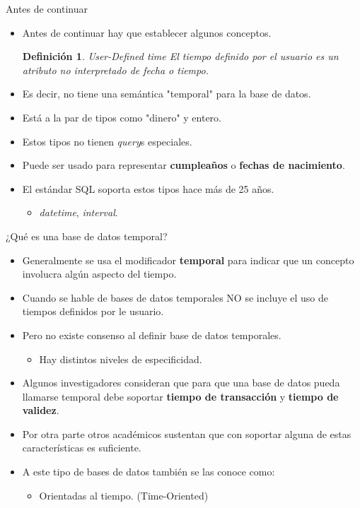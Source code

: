 \documentclass[handout, t, aspectratio=169]{beamer}
\newtheorem{definicion}[theorem]{Definición}
\begin{document}
\begin{frame}{Antes de continuar}
    \begin{itemize}
        \item Antes de continuar hay que establecer algunos conceptos.\pause
        \begin{definicion}{User-Defined time}
        El \textit{tiempo definido por el usuario} es un atributo no interpretado de fecha o tiempo.
        \end{definicion}\pause
        \item Es decir, no tiene una semántica "temporal" para la base de datos.\pause
        \item Está a la par de tipos como "dinero" y entero.\pause
        \item Estos tipos no tienen \textit{query}s especiales.\pause
        \item Puede ser usado para representar \textbf{cumpleaños} o \textbf{fechas de nacimiento}.\pause
        \item El estándar SQL soporta estos tipos hace más de 25 años.\pause
        \begin{itemize}
            \item \textit{datetime}, \textit{interval}.
        \end{itemize}
    \end{itemize}
\end{frame}

\begin{frame}{¿Qué es una base de datos temporal?}
    \begin{itemize}
        \item Generalmente se usa el modificador \textbf{temporal} para indicar que un concepto involucra algún aspecto del tiempo.\pause
        \item Cuando se hable de bases de datos temporales \alert{NO} se incluye el uso de tiempos definidos por le usuario.\pause
        \item Pero no existe consenso al definir base de datos temporales.\pause
        \begin{itemize}
            \item Hay distintos niveles de especificidad.
        \end{itemize}\pause
        \item Algunos investigadores consideran que para que una base de datos pueda llamarse temporal debe soportar \textbf{tiempo de transacción} y \textbf{tiempo de validez}.\pause
        \item Por otra parte otros académicos sustentan que con soportar alguna de estas características es suficiente.\pause
        
        \item A este tipo de bases de datos también se las conoce como:
        \begin{itemize}
            \item Orientadas al tiempo. (Time-Oriented)
        \end{itemize}
    \end{itemize}
\end{frame}
\end{document}
